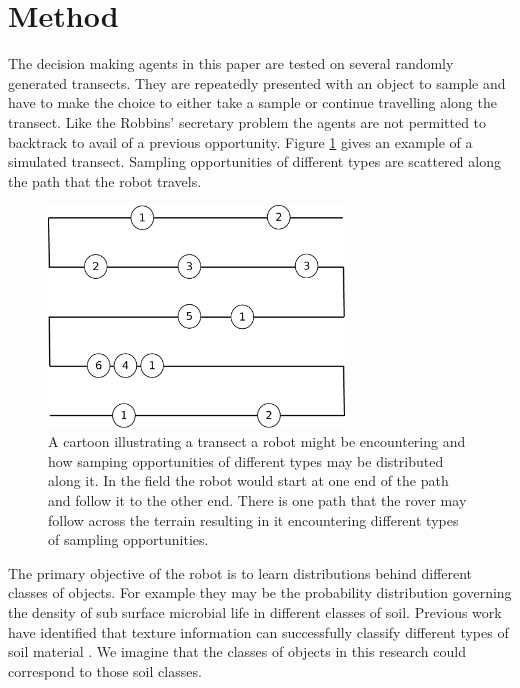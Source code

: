 \section{Method}
\label{sec:method}

The decision making agents in this paper are tested on several randomly
generated transects.  They are repeatedly presented with an object to sample
and have to make the choice to either take a sample or continue travelling
along the transect.  Like the Robbins' secretary problem the agents are not
permitted to backtrack to avail of a previous opportunity.  Figure \ref{fig:transect} gives an example of a simulated transect. Sampling opportunities of different types are scattered along the path that the robot travels.  

\begin{figure}[htpd!]
	\centering 
	\includegraphics[width=0.7\textwidth]{transect}
	\caption{A cartoon illustrating a transect a robot might be encountering and how samping opportunities of different types may be distributed along it.  In the field the robot would start at one end of the path and follow it to the other end.  There is one path that the rover may follow across the terrain resulting in it encountering different types of sampling opportunities.}
	\label{fig:transect}
\end{figure}


The primary objective of the robot is to learn distributions behind different
classes of objects.  For example they may be the probability distribution
governing the density of sub surface microbial life in different classes of
soil.  Previous work have identified that texture information can successfully
classify different types of soil material \cite{dunlop2006automatic}.  
We imagine that the classes of objects in this research could correspond to those soil classes.


